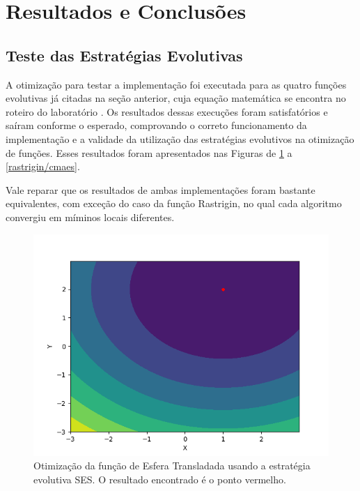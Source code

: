 \documentclass[conference]{IEEEtran}
\begin{document}
\section{Resultados e Conclusões}

\subsection{Teste das Estratégias Evolutivas}

A otimização para testar a implementação foi executada para as quatro funções evolutivas já citadas na seção anterior, cuja equação matemática se encontra no roteiro do laboratório \cite{b1}. Os resultados dessas execuções foram satisfatórios e saíram conforme o esperado, comprovando o correto funcionamento da implementação e a validade da utilização das estratégias evolutivos na otimização de funções. Esses resultados foram apresentados nas Figuras de \ref{translated_sphere/ses} a \ref{rastrigin/cmaes}.

Vale reparar que os resultados de ambas implementações foram bastante equivalentes, com exceção do caso da função Rastrigin, no qual cada algoritmo convergiu em míminos locais diferentes.

\begin{figure}[htbp]
\centering
\centerline{\includegraphics[scale=0.5]{imagens/translated_sphere/ses.png}}
\caption{Otimização da função de Esfera Transladada usando a estratégia evolutiva SES. O resultado encontrado é o ponto vermelho.}
\label{translated_sphere/ses}
\end{figure}
\end{document}
